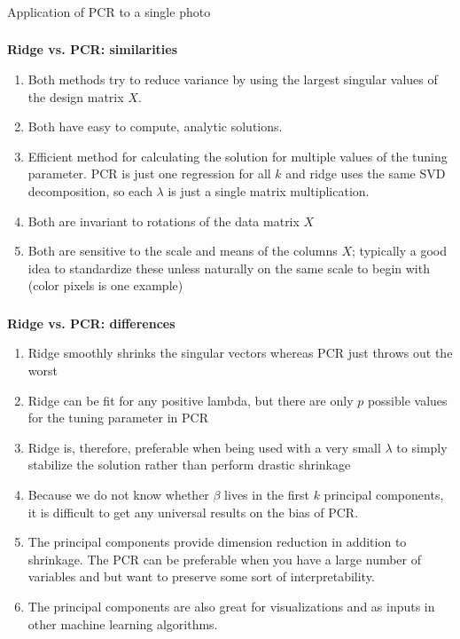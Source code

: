 \begin{frame}[fragile] \frametitle{}

{\color{yaleblue}\fontsize{16pt}{20pt}\selectfont Application of PCR to a single photo}

\end{frame}

\begin{frame}[fragile] \frametitle{}

\textbf{Ridge vs. PCR: similarities}

\begin{enumerate}
\item Both methods try to reduce variance by using the largest singular values
  of the design matrix $X$.\pause
\item Both have easy to compute, analytic solutions.\pause
\item Efficient method for calculating the solution for multiple values of the
  tuning parameter. PCR is just one regression for all $k$ and ridge uses the
  same SVD decomposition, so each $\lambda$ is just a single matrix multiplication. \pause
\item Both are invariant to rotations of the data matrix $X$ \pause
\item Both are sensitive to the scale and means of the columns $X$; typically a good
  idea to standardize these unless naturally on the same scale to begin with (color
  pixels is one example)
\end{enumerate}

\end{frame}

\begin{frame}[fragile] \frametitle{}

\textbf{Ridge vs. PCR: differences}

\begin{enumerate}
\item Ridge smoothly shrinks the singular vectors whereas PCR just throws out the worst\pause
\item Ridge can be fit for any positive lambda, but there are only $p$ possible values for
  the tuning parameter in PCR\pause
\item Ridge is, therefore, preferable when being used with a very small $\lambda$ to
  simply stabilize the solution rather than perform drastic shrinkage
\item Because we do not know whether $\beta$ lives in the first $k$ principal components,
  it is difficult to get any universal results on the bias of PCR.\pause
\item The principal components provide dimension reduction in addition to shrinkage.
  The PCR can be preferable when you have a large number of variables and but want to
  preserve some sort of interpretability.\pause
\item The principal components are also great for visualizations and as inputs in other
  machine learning algorithms.
\end{enumerate}

\end{frame}

